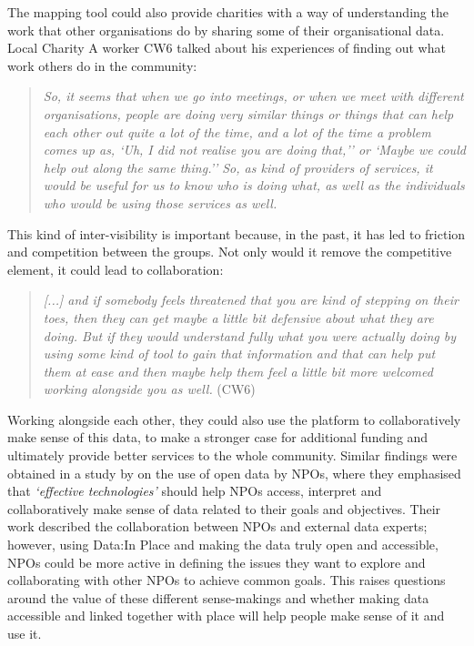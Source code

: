 The mapping tool could also provide charities with a way of understanding the work that other organisations do by sharing some of their organisational data. Local Charity A worker CW6 talked about his experiences of finding out what work others do in the community:
\begin{quote}
    \textit{So, it seems that when we go into meetings, or when we meet with different organisations, people are doing very similar things or things that can help each other out quite a lot of the time, and a lot of the time a problem comes up as, `Uh, I did not realise you are doing that,'' or `Maybe we could help out along the same thing.'' So, as kind of providers of services, it would be useful for us to know who is doing what, as well as the individuals who would be using those services as well.}
\end{quote}
This kind of inter-visibility is important because, in the past, it has led to friction and competition between the groups. Not only would it remove the competitive element, it could lead to collaboration:
\begin{quote}
    \textit{[...] and if somebody feels threatened that you are kind of stepping on their toes, then they can get maybe a little bit defensive about what they are doing. But if they would understand fully what you were actually doing by using some kind of tool to gain that information and that can help put them at ease and then maybe help them feel a little bit more welcomed working alongside you as well.} (CW6)
\end{quote}

Working alongside each other, they could also use the platform to collaboratively make sense of this data, to make a stronger case for additional funding and ultimately provide better services to the whole community. Similar findings were obtained in a study by \citet{erete_storytelling_2016} on the use of open data by NPOs, where they emphasised that \textit{`effective technologies'} should help NPOs access, interpret and collaboratively make sense of data related to their goals and objectives. Their work described the collaboration between NPOs and external data experts; however, using Data:In Place and making the data truly open and accessible, NPOs could be more active in defining the issues they want to explore and collaborating with other NPOs to achieve common goals. This raises questions around the value of these different sense-makings and whether making data accessible and linked together with place will help people make sense of it and use it.

